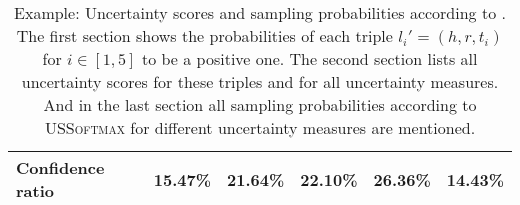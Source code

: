 \begin{table}[h]
\begin{tabular}{llllll}
        Confidence ratio
        & 15.47\% & 21.64\% & 22.10\% & 26.36\% & 14.43\% \\
        
        \bottomrule
    \end{tabular}
    \caption{Example: Uncertainty scores and sampling probabilities according to \ussoftmax. 
    The first section shows the probabilities of each triple $l_i' = (h, r, t_i)$ for $i \in [1,5]$ to be a positive one. 
    The second section lists all uncertainty scores for these triples and for all uncertainty measures.
    And in the last section all sampling probabilities according to \textsc{USSoftmax} for different uncertainty measures are mentioned.}
\label{tab:uncertainty_measure_example_softmax}
\end{table}